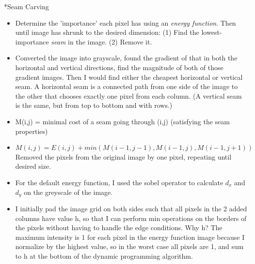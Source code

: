 \documentclass[3pt,landscape]{article}
\makeatletter
\renewcommand{\subsection}{\@startsection{subsection}{2}{0mm}{-1explus -.5ex minus -.2ex}{0.5ex plus .2ex}{\normalfont\normalsize\bfseries}}
\makeatother
\begin{document}
\begin{multicols}{3}
\subsection*{Seam Carving}
\begin{itemize}
\item Determine the 'importance' each pixel has using an \textit{energy function}. Then until image has shrunk to the desired dimension: (1) Find the lowest-importance \textit{seam} in the image. (2) Remove it.
\item Converted the image into grayscale, found the gradient of that in both the horizontal and vertical directions, find the magnitude of both of those gradient images. Then I would find either the cheapest horizontal or vertical seam. A horizontal seam is a connected path from one side of the image to the other that chooses exactly one pixel from each column. (A vertical seam is the same, but from top to bottom and with rows.) 
\item M(i,j) = minimal cost of a seam going through (i,j) (satisfying the seam properties)
\item $M(i, j)= E(i, j) + min(M(i −1, j −1),M(i −1, j),M(i −1, j +1))$
Removed the pixels from the original image by one pixel, repeating until desired size.
\item For the default energy function, I used the sobel operator to calculate $d_x$ and $d_y$ on the greyscale of the image.
\item I initially pad the image grid on both sides such that all pixels in the 2 added columns have value h, so that I can perform min operations on the borders of the pixels without having to handle the edge conditions. Why h? The maximum intensity is 1 for each pixel in the energy function image because I normalize by the highest value, so in the worst case all pixels are 1, and sum to h at the bottom of the dynamic programming algorithm.
\end{itemize}


\end{multicols}
\end{document}

